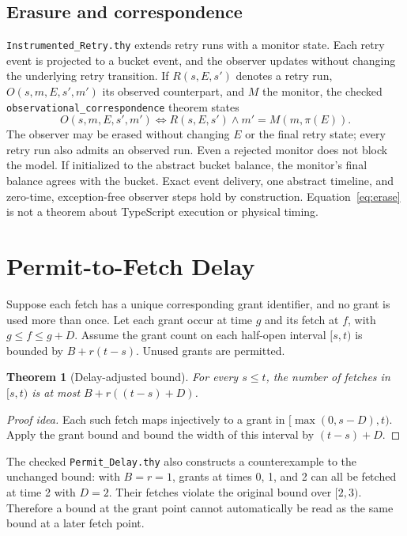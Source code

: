\documentclass[10pt,twocolumn]{article}
\newtheorem{theorem}{Theorem}
\begin{document}
\subsection{Erasure and correspondence}
\texttt{Instrumented\_Retry.thy} extends retry runs with a monitor state. Each retry event is projected to a bucket event, and the observer updates without changing the underlying retry transition. If $R(s,E,s')$ denotes a retry run, $O(s,m,E,s',m')$ its observed counterpart, and $M$ the monitor, the checked \texttt{observational\_correspondence} theorem states
\begin{equation}\label{eq:erase}
 O(s,m,E,s',m')\iff R(s,E,s')\land m'=M(m,\pi(E)).
\end{equation}
The observer may be erased without changing $E$ or the final retry state; every retry run also admits an observed run. Even a rejected monitor does not block the model. If initialized to the abstract bucket balance, the monitor's final balance agrees with the bucket. Exact event delivery, one abstract timeline, and zero-time, exception-free observer steps hold by construction. Equation~\eqref{eq:erase} is not a theorem about TypeScript execution or physical timing.

\section{Permit-to-Fetch Delay}
Suppose each fetch has a unique corresponding grant identifier, and no grant is used more than once. Let each grant occur at time $g$ and its fetch at $f$, with $g\le f\le g+D$. Assume the grant count on each half-open interval $[s,t)$ is bounded by $B+r(t-s)$. Unused grants are permitted.
\begin{theorem}[Delay-adjusted bound]\label{thm:delay}
For every $s\leq t$, the number of fetches in $[s,t)$ is at most $B+r((t-s)+D)$.
\end{theorem}
\begin{proof}[Proof idea]
Each such fetch maps injectively to a grant in $[\max(0,s-D),t)$. Apply the grant bound and bound the width of this interval by $(t-s)+D$.
\end{proof}
The checked \texttt{Permit\_Delay.thy} also constructs a counterexample to the unchanged bound: with $B=r=1$, grants at times 0, 1, and 2 can all be fetched at time 2 with $D=2$. Their fetches violate the original bound over $[2,3)$. Therefore a bound at the grant point cannot automatically be read as the same bound at a later fetch point.
\end{document}
